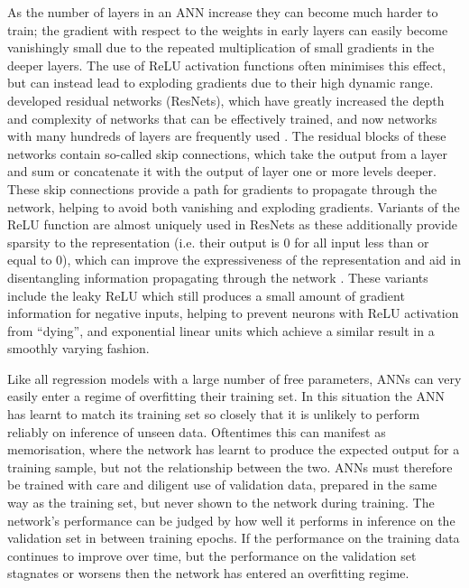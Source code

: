 As the number of layers in an ANN increase they can become much harder to train; the gradient with respect to the weights in early layers can easily become vanishingly small due to the repeated multiplication of small gradients in the deeper layers.
The use of ReLU activation functions often minimises this effect, but can instead lead to exploding gradients due to their high dynamic range.
\citet{2015He} developed residual networks (ResNets), which have greatly increased the depth and complexity of networks that can be effectively trained, and now networks with many hundreds of layers are frequently used \citep{Jegou2017}.
The residual blocks of these networks contain so-called skip connections, which take the output from a layer and sum or concatenate it with the output of layer one or more levels deeper.
These skip connections provide a path for gradients to propagate through the network, helping to avoid both vanishing and exploding gradients.
Variants of the ReLU function are almost uniquely used in ResNets as these additionally provide sparsity to the representation (i.e. their output is 0 for all input less than or equal to 0), which can improve the expressiveness of the representation and aid in disentangling information propagating through the network \citep{Glorot2011}.
These variants include the leaky ReLU \citep[$\max(0.01x, x)$;][]{Maas2013} which still produces a small amount of gradient information for negative inputs, helping to prevent neurons with ReLU activation from ``dying'', and exponential linear units \citep[ELUs;][]{Clevert2015} which achieve a similar result in a smoothly varying fashion.

Like all regression models with a large number of free parameters, ANNs can very easily enter a regime of overfitting their training set.
In this situation the ANN has learnt to match its training set so closely that it is unlikely to perform reliably on inference of unseen data.
Oftentimes this can manifest as memorisation, where the network has learnt to produce the expected output for a training sample, but not the relationship between the two.
ANNs must therefore be trained with care and diligent use of validation data, prepared in the same way as the training set, but never shown to the network during training.
The network's performance can be judged by how well it performs in inference on the validation set in between training epochs.
If the performance on the training data continues to improve over time, but the performance on the validation set stagnates or worsens then the network has entered an overfitting regime.

